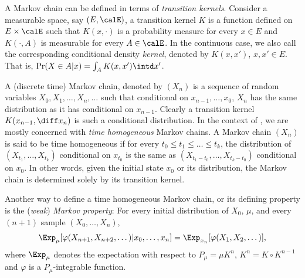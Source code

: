 A Markov chain can be defined in terms of \emph{transition kernels}. Consider
a measurable space, say $(E,\calE)$, a transition kernel $K$ is a function defined
on $E\times\calE$ such that $K(x,\cdot)$ is a probability measure for every
$x\in E$ and $K(\cdot,A)$ is measurable for every $A\in\calE$. In the
continuous case, we also call the corresponding conditional density
\emph{kernel}, denoted by $K(x,x')$, $x,x'\in E$. That is, $\Pr(X\in A|x) =
\int_A K(x,x')\intd x'$.

A (discrete time) Markov chain, denoted by $(X_n)$ is a sequence of random
variables $X_0,X_1,\dots,X_n,\dots$ such that conditional on
$x_{n-1},\dots,x_0$, $X_n$ has the same distribution as it has conditional on
$x_{n-1}$. Clearly a transition kernel $K(x_{n-1},\diff x_n)$ is such a
conditional distribution. In the context of \mcmc, we are mostly concerned
with \emph{time homogeneous} Markov chains. A Markov chain $(X_n)$ is said to
be time homogeneous if for every $t_0\le t_1\le\dots\le t_k$, the distribution
of $(X_{t_1},\dots,X_{t_k})$ conditional on $x_{t_0}$ is the same as
$(X_{t_1-t_0},\dots,X_{t_k-t_0})$ conditional on $x_0$. In other words, given
the initial state $x_0$ or its distribution, the Markov chain is determined
solely by its transition kernel.

Another way to define a time homogeneous Markov chain, or its defining
property is the (\emph{weak}) \emph{Markov property}: For every initial
distribution of $X_0$, $\mu$, and every $(n+1)$ sample $(X_0,\dots,X_n)$,
\begin{equation}
  \Exp_{\mu}[\varphi(X_{n+1},X_{n+2},\dots)|x_0,\dots,x_n] =
  \Exp_{x_n}[\varphi(X_1,X_2,\dots)],
\end{equation}
where $\Exp_{\mu}$ denotes the expectation with respect to $P_{\mu} = \mu
K^n$, $K^n = K\vysmwhtcircle K^{n-1}$ and $\varphi$ is a $P_{\mu}$-integrable
function.

